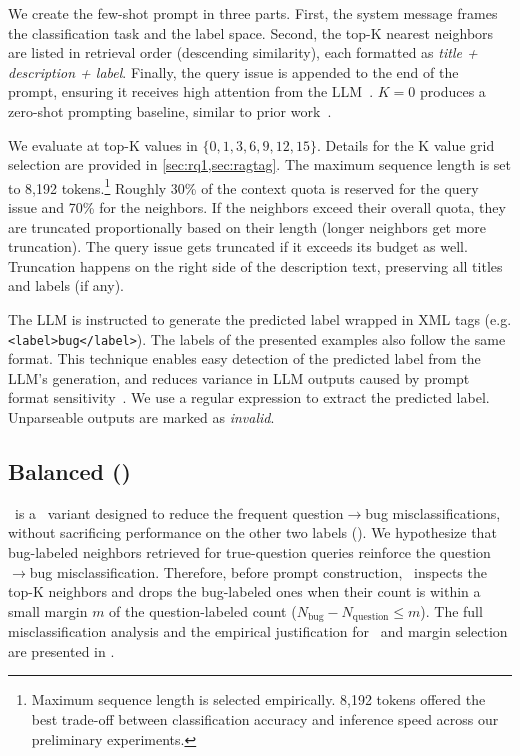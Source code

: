 We create the few-shot prompt in three parts. First, the system message frames the classification task and the label space. Second, the top-K nearest neighbors are listed in retrieval order (descending similarity), each formatted as \textit{title + description + label}. Finally, the query issue is appended to the end of the prompt, ensuring it receives high attention from the LLM~\cite{liu2024lost}. $K=0$ produces a zero-shot prompting baseline, similar to prior work~\cite{colavito2025benchmarking}.

We evaluate \ragtag at top-K values in $\{0, 1, 3, 6, 9, 12, 15\}$. Details
for the K value grid selection are provided in \cref{sec:rq1,sec:ragtag}. The maximum sequence length is set to 8,192 tokens.\footnote{Maximum sequence length is selected empirically. 8,192 tokens offered the best trade-off between classification accuracy and inference speed across our preliminary experiments.} Roughly 30\% of the
context quota is reserved for the query issue and 70\% for the
neighbors. If the neighbors exceed their overall quota, they are
truncated proportionally based on their length (longer neighbors get
more truncation). The query issue gets truncated if it exceeds its
budget as well. Truncation happens on the right side of the
description text, preserving all titles and labels (if any).


The LLM is instructed to generate the predicted label wrapped in XML tags (e.g. \texttt{<label>bug</label>}). The labels of the presented examples also follow the same format. This technique enables easy detection of the predicted label from the LLM's generation, and reduces variance in LLM outputs caused by prompt format sensitivity~\cite{sclar2023quantifying}. We use a regular expression to extract the predicted label. Unparseable outputs are marked as \textit{invalid}.


\subsection{Balanced \ragtag (\bragtag)} \bragtag\ is a \ragtag\ variant designed to reduce the frequent question$\rightarrow$bug misclassifications, without sacrificing performance on the other two labels (). We hypothesize that bug-labeled neighbors retrieved for true-question queries reinforce the question$\rightarrow$bug misclassification. Therefore, before prompt construction, \bragtag\ inspects the top-K neighbors and drops the bug-labeled ones when their count is within a small margin $m$ of the question-labeled count ($N_\text{bug} - N_\text{question} \le m$). The full misclassification analysis and the empirical justification for \bragtag\ and margin selection are presented in .


